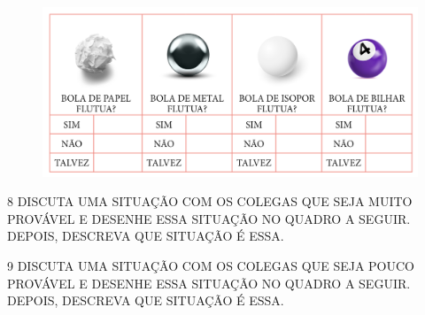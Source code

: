 \begin{figure}[htpb!]
\includegraphics[width=\textwidth]{../ilustracoes/MAT1/SAEB_1ANO_MAT_FIGURA90.png}
\end{figure}


\num{8} DISCUTA UMA SITUAÇÃO COM OS COLEGAS QUE SEJA MUITO PROVÁVEL E DESENHE
ESSA SITUAÇÃO NO QUADRO A SEGUIR. DEPOIS, DESCREVA QUE SITUAÇÃO É ESSA.

\begin{mdframed}[linewidth=2pt,linecolor=salmao,roundcorner=10pt]
\vspace{13cm}
\end{mdframed}


\num{9} DISCUTA UMA SITUAÇÃO COM OS COLEGAS QUE SEJA POUCO PROVÁVEL E DESENHE
ESSA SITUAÇÃO NO QUADRO A SEGUIR. DEPOIS, DESCREVA QUE SITUAÇÃO É ESSA.

\begin{mdframed}[linewidth=2pt,linecolor=salmao,roundcorner=10pt]
\vspace{19cm}
\end{mdframed}


